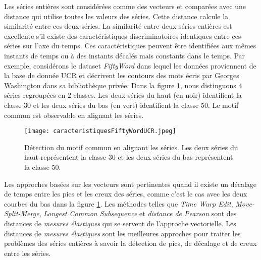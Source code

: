 Les s\'eries enti\`eres sont consid\'er\'ees comme des vecteurs et compar\'ees avec une distance qui utilise toutes les valeurs des s\'eries. 
Cette distance calcule la similarit\'e entre ces deux s\'eries.
La similarit\'e entre deux s\'eries enti\`eres est excellente  s'il existe des caract\'eristiques discriminatoires identiques entre ces s\'eries sur l'axe du temps. Ces caract\'eristiques peuvent \^etre identifi\'ees aux m\^emes instants de temps ou \`a des instants d\'ecal\'es mais constants dans le temps. 
\newline
Par exemple, consid\'erons le dataset {\em FiftyWord} \cite{rath2003word} dans lequel les donn\'ees proviennent de la base de donn\'ee {UCR} \cite{chen2015ucr} et d\'ecrivent les contours des mots \'ecris par Georges Washington dans sa biblioth\`eque priv\'ee. Dans la figure \ref{caracteristiquesFiftyWordUCR}, nous distinguons $4$ s\'eries regroup\'ees en $2$ classes. Les deux s\'eries du haut (en noir) identifient la classe $30$ et les deux s\'eries du bas (en vert) identifient la classe $50$. Le motif commun est observable en alignant les s\'eries.
\begin{figure}[htb!] 
\centering
\texttt{[image: caracteristiquesFiftyWordUCR.jpeg]}
\caption{D\'etection du motif commun en alignant les s\'eries. Les deux s\'eries du haut repr\'esentent la classe $30$ et les deux s\'eries du bas repr\'esentent la classe $50$.}
\label{caracteristiquesFiftyWordUCR}
\end{figure}

Les approches bas\'ees sur les vecteurs sont pertinentes quand il existe un d\'ecalage de temps entre les pics et les creux des s\'eries, comme c'est le cas avec les deux courbes du bas dans la figure \ref{caracteristiquesFiftyWordUCR}. 
\newline
Les m\'ethodes telles que 
{\em Time Warp Edit}, {\em Move-Split-Merge}, 
{\em Longest Common Subsequence } et 
{\em distance de Pearson} sont des distances de {\em mesures \'elastiques} qui se servent de l'approche vectorielle. 
Les  distances de {\em mesures \'elastiques} sont les meilleures approches pour traiter les probl\`emes des s\'eries enti\`eres \`a savoir la d\'etection de pics, de d\'ecalage et de creux entre les s\'eries.

